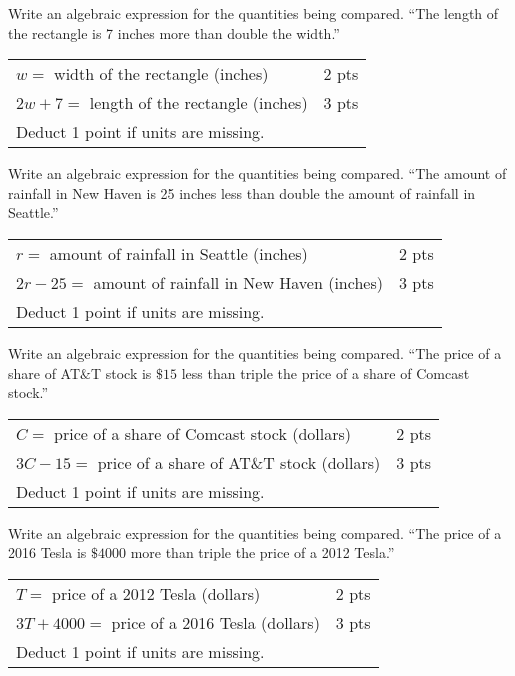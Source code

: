 {
	Write an algebraic expression for the quantities being compared. ``The length of the rectangle is 7 inches more than double the width.''
}
{
	\begin{tabular}{l r}
	$w=$ width of the rectangle (inches) & 2 pts\\
	$2w+7=$ length of the rectangle (inches) & 3 pts\\
	Deduct 1 point if units are missing.
	\end{tabular}
}

{
	Write an algebraic expression for the quantities being compared. ``The amount of rainfall in New Haven is 25 inches less than double the amount of rainfall in Seattle.''
}
{
	\begin{tabular}{l r}
	$r=$ amount of rainfall in Seattle (inches) & 2 pts\\
	$2r-25=$ amount of rainfall in New Haven (inches) & 3 pts\\
	Deduct 1 point if units are missing.
	\end{tabular}
}

{
	Write an algebraic expression for the quantities being compared. ``The price of a share of AT$\&$T stock is $\$15$ less than triple the price of a share of Comcast stock.''
}
{
	\begin{tabular}{l r}
	$C=$ price of a share of Comcast stock (dollars) & 2 pts\\
	$3C-15=$ price of a share of AT$\&$T stock (dollars) & 3 pts\\
	Deduct 1 point if units are missing.
	\end{tabular}
}

{
	Write an algebraic expression for the quantities being compared. ``The price of a 2016 Tesla is $\$4000$ more than triple the price of a 2012 Tesla.''
}
{
	\begin{tabular}{l r}
	$T=$ price of a 2012 Tesla (dollars) & 2 pts\\
	$3T+4000=$ price of a 2016 Tesla (dollars) & 3 pts\\
	Deduct 1 point if units are missing.
	\end{tabular}
}